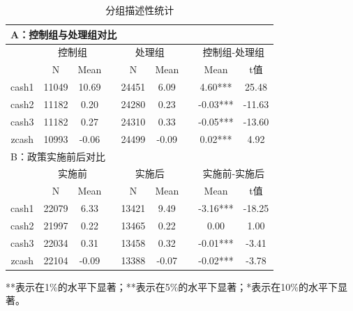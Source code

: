 \documentclass{article}
\begin{document}
\begin{table}[H]
    \centering
    \caption{分组描述性统计}
    \begin{tabular}{ccccccccc}
    \hline
    \multicolumn{9}{l}{A：控制组与处理组对比}                                                               \\ \toprule
          & \multicolumn{2}{c}{控制组} &  & \multicolumn{2}{c}{处理组} &  & \multicolumn{2}{c}{控制组-处理组} \\ \cline{2-3} \cline{5-6} \cline{8-9} 
          & N          & Mean       &  & N          & Mean       &  & Mean          & t值          \\ \hline
    cash1 & 11049      & 10.69      &  & 24451      & 6.09       &  & 4.60***       & 25.48       \\
    cash2 & 11182      & 0.20       &  & 24280      & 0.23       &  & -0.03***      & -11.63      \\
    cash3 & 11182      & 0.27       &  & 24310      & 0.33       &  & -0.05***      & -13.60      \\
    zcash & 10993      & -0.06      &  & 24499      & -0.09      &  & 0.02***       & 4.92        \\ \hline
    \multicolumn{9}{l}{B：政策实施前后对比}                                                                \\ \hline
          & \multicolumn{2}{c}{实施前} &  & \multicolumn{2}{c}{实施后} &  & \multicolumn{2}{c}{实施前-实施后} \\ \cline{2-3} \cline{5-6} \cline{8-9} 
          & N          & Mean       &  & N          & Mean       &  & Mean          & t值          \\ \hline
    cash1 & 22079      & 6.33       &  & 13421      & 9.49       &  & -3.16***      & -18.25      \\
    cash2 & 21997      & 0.22       &  & 13465      & 0.22       &  & 0.00          & 1.00        \\
    cash3 & 22034      & 0.31       &  & 13458      & 0.32       &  & -0.01***      & -3.41       \\
    zcash & 22104      & -0.09      &  & 13388      & -0.07      &  & -0.02***      & -3.78       \\ \bottomrule
    \end{tabular}
    \begin{tablenotes}
        \item ***表示在1\%的水平下显著；**表示在5\%的水平下显著；*表示在10\%的水平下显著。
    \end{tablenotes}
    
\end{table}
\end{document}
